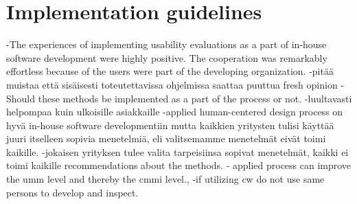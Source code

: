 \documentclass[12pt,a4paper,oneside,pdftex]{report}
\begin{document}





\section{Implementation guidelines}
\label{sec:implementationguidelines}
-The experiences of implementing usability evaluations as a part of in-house software development were highly positive. The cooperation was remarkably effortless because of the users were part of the developing organization.  
-pitää muistaa että sisäisesti toteutettavissa ohjelmissa saattaa puuttua fresh opinion
    -Should these methods be implemented as a part of the process or not.
-luultavasti helpompaa kuin ulkoisille asiakkaille
-applied human-centered design process on hyvä in-house software developmentiin mutta kaikkien yritysten tulisi käyttää juuri itselleen sopivia menetelmiä, eli valitsemamme menetelmät eivät toimi kaikille.
-jokaisen yrityksen tulee valita tarpeisiinsa sopivat menetelmät, kaikki ei toimi kaikille
recommendations about the methods.
- applied process can improve the umm level and thereby the cmmi level.,
-if utilizing cw do not use same persons to develop and inspect.




\end{document}
